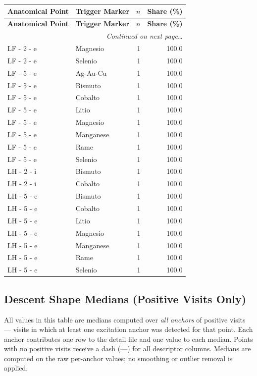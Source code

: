 \documentclass[a4paper,11pt]{article}
\begin{document}
\begin{footnotesize}
\begin{longtable}{p{3.5cm}p{7.5cm}rr}
\toprule
\textbf{Anatomical Point} &
\textbf{Trigger Marker} &
\textbf{$n$} &
\textbf{Share (\%)} \\
\midrule
\endfirsthead
\toprule
\textbf{Anatomical Point} &
\textbf{Trigger Marker} &
\textbf{$n$} &
\textbf{Share (\%)} \\
\midrule
\endhead
\midrule
\multicolumn{4}{r}{\footnotesize\emph{Continued on next page\ldots}} \\
\endfoot
\bottomrule
\endlastfoot
LF - 2 - e & Magnesio & 1 & 100.0 \\
LF - 2 - e & Selenio & 1 & 100.0 \\
LF - 5 - e & Ag-Au-Cu & 1 & 100.0 \\
LF - 5 - e & Bismuto & 1 & 100.0 \\
LF - 5 - e & Cobalto & 1 & 100.0 \\
LF - 5 - e & Litio & 1 & 100.0 \\
LF - 5 - e & Magnesio & 1 & 100.0 \\
LF - 5 - e & Manganese & 1 & 100.0 \\
LF - 5 - e & Rame & 1 & 100.0 \\
LF - 5 - e & Selenio & 1 & 100.0 \\
LH - 2 - i & Bismuto & 1 & 100.0 \\
LH - 2 - i & Cobalto & 1 & 100.0 \\
LH - 5 - e & Bismuto & 1 & 100.0 \\
LH - 5 - e & Cobalto & 1 & 100.0 \\
LH - 5 - e & Litio & 1 & 100.0 \\
LH - 5 - e & Magnesio & 1 & 100.0 \\
LH - 5 - e & Manganese & 1 & 100.0 \\
LH - 5 - e & Rame & 1 & 100.0 \\
LH - 5 - e & Selenio & 1 & 100.0 \\
\end{longtable}
\end{footnotesize}

\subsection{Descent Shape Medians (Positive Visits Only)}

All values in this table are medians computed over \emph{all anchors} of positive visits ---
visits in which at least one excitation anchor was detected for that point. Each anchor
contributes one row to the detail file and one value to each median. Points with no positive
visits receive a dash (---) for all descriptor columns.
Medians are computed on the raw per-anchor values; no smoothing or outlier removal is
applied.
\end{document}
